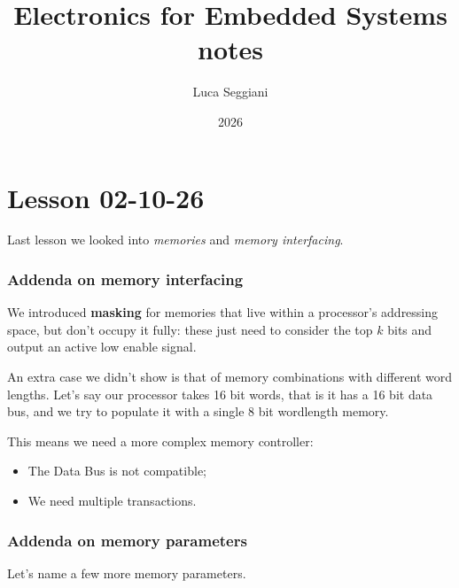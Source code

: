 \documentclass[a4paper,11pt]{article}
\title{Electronics for Embedded Systems notes}
\author{Luca Seggiani}
\date{2026}
\begin{document}
\section{Lesson 02-10-26}

\thispagestyle{empty}
\pagestyle{fancy}


Last lesson we looked into \textit{memories} and \textit{memory interfacing}.

\subsubsection{Addenda on memory interfacing}

We introduced \textbf{masking} for memories that live within a processor's addressing space, but don't occupy it fully: these just need to consider the top $k$ bits and output an active low enable signal.

An extra case we didn't show is that of memory combinations with different word lengths.
Let's say our processor takes 16 bit words, that is it has a 16 bit data bus, and we try to populate it with a single 8 bit wordlength memory.

This means we need a more complex memory controller:
\begin{itemize}
	\item The Data Bus is not compatible;
	\item We need multiple transactions.
\end{itemize}

\subsubsection{Addenda on memory parameters}

Let's name a few more memory parameters.
\end{document}

